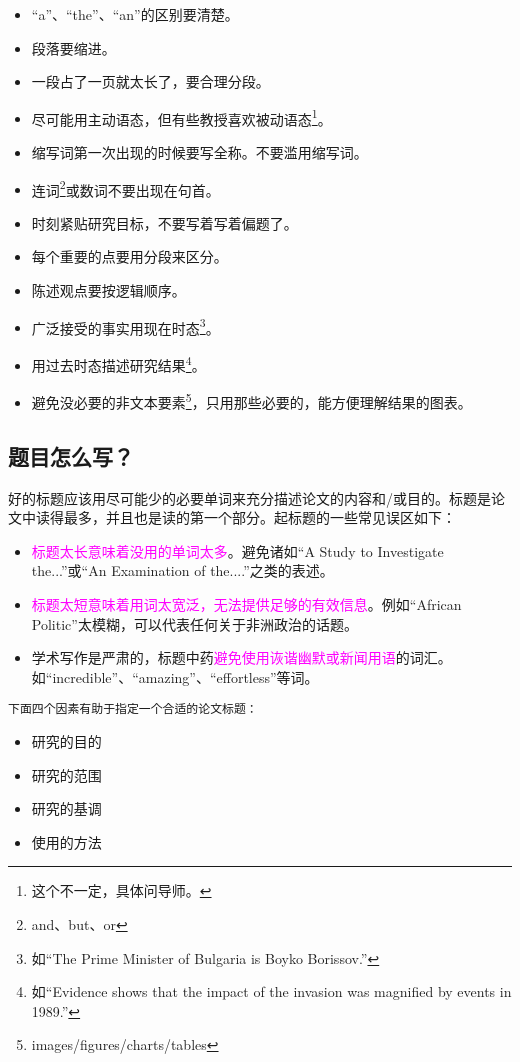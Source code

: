 \documentclass[cn,hazy,blue,14pt,screen]{elegantnote} %
\begin{document}
\begin{itemize}
  \item “a”、“the”、“an”的区别要清楚。
  \item 段落要缩进。
  \item 一段占了一页就太长了，要合理分段。
  \item 尽可能用主动语态，但有些教授喜欢被动语态\footnote{这个不一定，具体问导师。}。
  \item 缩写词第一次出现的时候要写全称。不要滥用缩写词。
  \item 连词\footnote{and、but、or}或数词不要出现在句首。
  \item 时刻紧贴研究目标，不要写着写着偏题了。
  \item 每个重要的点要用分段来区分。
  \item 陈述观点要按逻辑顺序。
  \item 广泛接受的事实用现在时态\footnote{如“The Prime Minister of Bulgaria is Boyko Borissov.”}。
  \item 用过去时态描述研究结果\footnote{如“Evidence shows that the impact of the invasion was magnified by events in 1989.”}。
  \item 避免没必要的非文本要素\footnote{images/figures/charts/tables}，只用那些必要的，能方便理解结果的图表。
\end{itemize}

\subsection{题目怎么写？}

好的标题应该用尽可能少的必要单词来充分描述论文的内容和/或目的。标题是论文中读得最多，并且也是读的第一个部分。起标题的一些常见误区如下：

\begin{itemize}
  \item \textcolor{magenta}{标题太长意味着没用的单词太多}。避免诸如“A Study to Investigate the...”或“An Examination of the....”之类的表述。
  \item \textcolor{magenta}{标题太短意味着用词太宽泛，无法提供足够的有效信息}。例如“African Politic”太模糊，可以代表任何关于非洲政治的话题。
  \item 学术写作是严肃的，标题中药\textcolor{magenta}{避免使用诙谐幽默或新闻用语}的词汇。如“incredible”、“amazing”、“effortless”等词。
\end{itemize}

\lstinline{下面四个因素有助于指定一个合适的论文标题：}

\begin{itemize}
  \item 研究的目的
  \item 研究的范围
  \item 研究的基调
  \item 使用的方法
\end{itemize}
\end{document}
